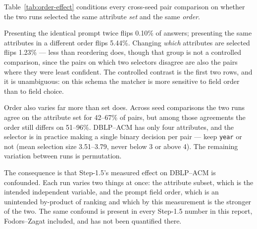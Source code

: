 \documentclass[11pt]{article}
\begin{document}
Table~\ref{tab:order-effect} conditions every cross-seed pair comparison on whether
the two runs selected the same attribute \emph{set} and the same \emph{order}.

\begin{table}[htbp]
\centering
\small
{}
\caption{DBLP--ACM, \texttt{random} sampler, all ten pairwise comparisons among the
five seeds (13{,}080 candidate pairs each). Holding the selected attribute set fixed
and permuting only the order in which those attributes appear in the prompt changes
the matcher's answer 54 times more often than presenting the identical prompt twice.}
\label{tab:order-effect}
\end{table}

Presenting the identical prompt twice flips 0.10\% of answers; presenting the same
attributes in a different order flips 5.44\%. Changing \emph{which} attributes are
selected flips 1.23\% --- less than reordering does, though that group is not a
controlled comparison, since the pairs on which two selectors disagree are also the
pairs where they were least confident. The controlled contrast is the first two rows,
and it is unambiguous: on this schema the matcher is more sensitive to field order
than to field choice.

Order also varies far more than set does. Across seed comparisons the two runs agree
on the attribute set for 42--67\% of pairs, but among those agreements the order
still differs on 51--96\%. DBLP--ACM has only four attributes, and the selector is in
practice making a single binary decision per pair --- keep \texttt{year} or not
(mean selection size 3.51--3.79, never below 3 or above 4). The remaining variation
between runs is permutation.

The consequence is that Step-1.5's measured effect on DBLP--ACM is confounded. Each
run varies two things at once: the attribute subset, which is the intended
independent variable, and the prompt field order, which is an unintended by-product
of ranking and which by this measurement is the stronger of the two. The same
confound is present in every Step-1.5 number in this report, Fodors--Zagat included,
and has not been quantified there.
\end{document}
